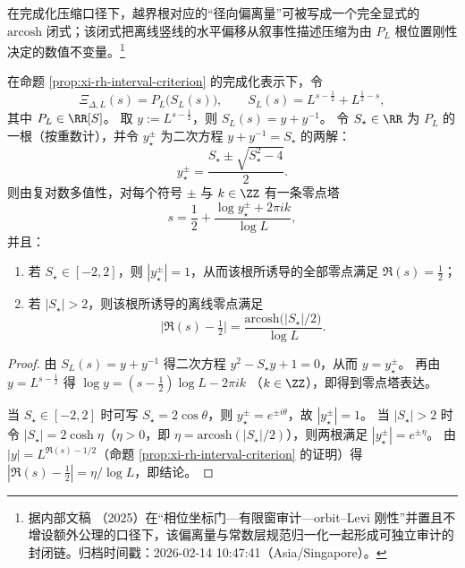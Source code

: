 在完成化压缩口径下，越界根对应的“径向偏离量”可被写成一个完全显式的 \(\mathrm{arcosh}\) 闭式；该闭式把离线竖线的水平偏移从叙事性描述压缩为由 \(P_L\) 根位置刚性决定的数值不变量。\footnote{据内部文稿 \cite{Internal2025ResolutionFoldingPhiPi}（2025）在“相位坐标门—有限窗审计—orbit--Levi 刚性”并置且不增设额外公理的口径下，该偏离量与常数层规范归一化一起形成可独立审计的封闭链。归档时间戳：2026-02-14 10:47:41（Asia/Singapore）。}

\begin{corollary}\label{cor:xi-single-scale-radial-deviation-arcosh}
在命题 \ref{prop:xi-rh-interval-criterion} 的完成化表示下，令
\[
\Xi_{\Delta,L}(s)=P_L\!\bigl(S_L(s)\bigr),\qquad S_L(s)=L^{s-\frac12}+L^{\frac12-s},
\]
其中 \(P_L\in\RR[S]\)。
取 \(y:=L^{s-\frac12}\)，则 \(S_L(s)=y+y^{-1}\)。
令 \(S_\star\in\RR\) 为 \(P_L\) 的一根（按重数计），并令 \(y_\star^{\pm}\) 为二次方程 \(y+y^{-1}=S_\star\) 的两解：
\[
y_\star^{\pm}=\frac{S_\star\pm\sqrt{S_\star^2-4}}{2}.
\]
则由复对数多值性，对每个符号 \(\pm\) 与 \(k\in\ZZ\) 有一条零点塔
\[
s=\frac12+\frac{\log y_\star^{\pm}+2\pi i k}{\log L},
\]
并且：
\begin{enumerate}
  \item 若 \(S_\star\in[-2,2]\)，则 \(|y_\star^\pm|=1\)，从而该根所诱导的全部零点满足 \(\Re(s)=\tfrac12\)；
  \item 若 \(|S_\star|>2\)，则该根所诱导的离线零点满足
  \[
  \bigl|\Re(s)-\tfrac12\bigr|
  =\frac{\mathrm{arcosh}\bigl(|S_\star|/2\bigr)}{\log L}.
  \]
\end{enumerate}
\end{corollary}

\begin{proof}
由 \(S_L(s)=y+y^{-1}\) 得二次方程 \(y^2-S_\star y+1=0\)，从而 \(y=y_\star^\pm\)。
再由 \(y=L^{s-\frac12}\) 得
\(
\log y=(s-\frac12)\log L-2\pi i k
\)
（\(k\in\ZZ\)），即得到零点塔表达。
\par
当 \(S_\star\in[-2,2]\) 时可写 \(S_\star=2\cos\theta\)，则 \(y_\star^\pm=e^{\pm i\theta}\)，故 \(|y_\star^\pm|=1\)。
当 \(|S_\star|>2\) 时令 \(|S_\star|=2\cosh\eta\)（\(\eta>0\)，即 \(\eta=\mathrm{arcosh}(|S_\star|/2)\)），则两根满足 \(|y_\star^\pm|=e^{\pm\eta}\)。
由 \(|y|=L^{\Re(s)-1/2}\)（命题 \ref{prop:xi-rh-interval-criterion} 的证明）得
\(
|\Re(s)-\tfrac12|
=\eta/\log L
\)，即结论。
\end{proof}

